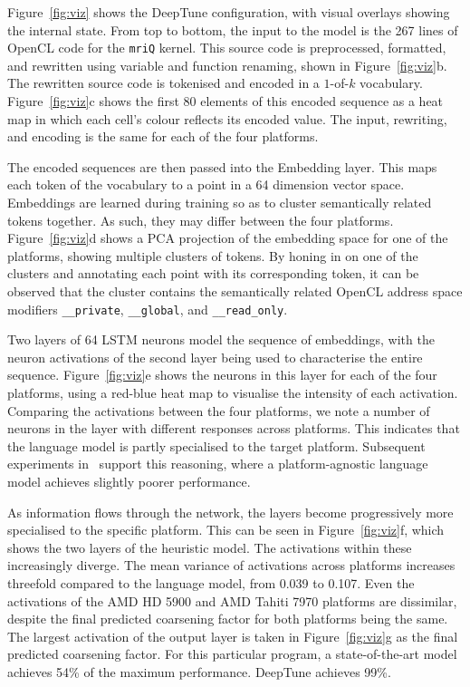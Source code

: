 Figure~\ref{fig:viz} shows the DeepTune configuration, with visual overlays showing the internal state. From top to bottom, the input to the model is the 267 lines of OpenCL code for the \texttt{mriQ} kernel. This source code is preprocessed, formatted, and rewritten using variable and function renaming, shown in Figure~\ref{fig:viz}b. The rewritten source code is tokenised and encoded in a $1$-of-$k$ vocabulary. Figure~\ref{fig:viz}c shows the first 80 elements of this encoded sequence as a heat map in which each cell's colour reflects its encoded value. The input, rewriting, and encoding is the same for each of the four platforms.



The encoded sequences are then passed into the Embedding layer. This maps each token of the vocabulary to a point in a 64 dimension vector space. Embeddings are learned during training so as to cluster semantically related tokens together. As such, they may differ between the four platforms. Figure~\ref{fig:viz}d shows a PCA projection of the embedding space for one of the platforms, showing multiple clusters of tokens. By honing in on one of the clusters and annotating each point with its corresponding token, it can be observed that the cluster contains the semantically related OpenCL address space modifiers \texttt{\_\_private}, \texttt{\_\_global}, and \texttt{\_\_read\_only}.

Two layers of 64 LSTM neurons model the sequence of embeddings, with the neuron activations of the second layer being used to characterise the entire sequence. Figure~\ref{fig:viz}e shows the neurons in this layer for each of the four platforms, using a red-blue heat map to visualise the intensity of each activation. Comparing the activations between the four platforms, we note a number of neurons in the layer with different responses across platforms. This indicates that the language model is partly specialised to the target platform. Subsequent experiments in~\cite{Ben-nun2018} support this reasoning, where a platform-agnostic language model achieves slightly poorer performance.

As information flows through the network, the layers become progressively more specialised to the specific platform. This can be seen in Figure~\ref{fig:viz}f, which shows the two layers of the heuristic model. The activations within these increasingly diverge. The mean variance of activations across platforms increases threefold compared to the language model, from 0.039 to 0.107. Even the activations of the AMD HD 5900 and AMD Tahiti 7970 platforms are dissimilar, despite the final predicted coarsening factor for both platforms being the same. The largest activation of the output layer is taken in Figure~\ref{fig:viz}g as the final predicted coarsening factor. For this particular program, a state-of-the-art model achieves 54\% of the maximum performance. DeepTune achieves 99\%.
